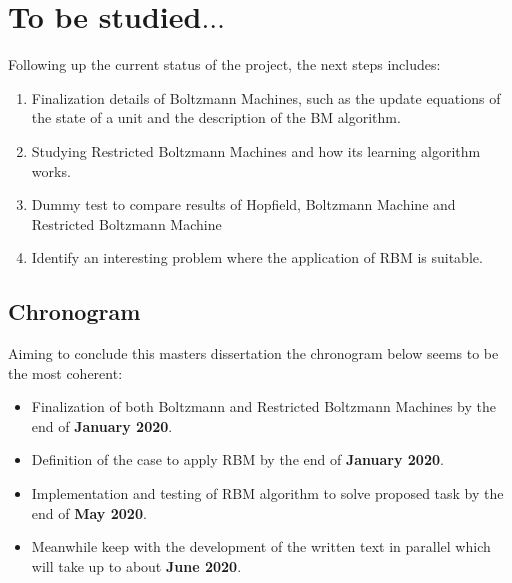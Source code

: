 \section*{To be studied$\ldots$}%
\label{ch:future:to-be-studied}%

Following up the current status of the project, the next steps includes:
\begin{enumerate}
  \item Finalization details of Boltzmann Machines, such as the update equations of the state of a unit and the description of the BM algorithm.
  \item Studying Restricted Boltzmann Machines and how its learning algorithm works.
  \item Dummy test to compare results of Hopfield, Boltzmann Machine and Restricted Boltzmann Machine
  \item Identify an interesting problem where the application of RBM is suitable.
\end{enumerate}

\subsection*{Chronogram}%
\label{ch:future:chronogram}

Aiming to conclude this masters dissertation the chronogram below seems to be the most coherent:
\begin{itemize}
  \item Finalization of both Boltzmann and Restricted Boltzmann Machines by the end of \textbf{January 2020}.
  \item Definition of the case to apply RBM by the end of \textbf{January 2020}.
  \item Implementation and testing of RBM algorithm to solve proposed task by the end of \textbf{May 2020}.
  \item Meanwhile keep with the development of the written text in parallel which will take up to about \textbf{June 2020}.
\end{itemize}
